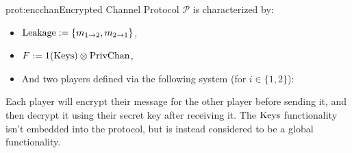 \begin{protocol}{prot:encchan}{Encrypted Channel Protocol}
    $\mathcal{P}$ is characterized by:
    \begin{itemize}
        \item $\text{Leakage} := \{m_{1\to 2}, m_{2\to1}\}$,
        \item $F := 1(\text{Keys}) \otimes \text{PrivChan}$,
        \item And two players defined via the following system (for $i \in \{1, 2\}$):
    \end{itemize}

\end{protocol}

Each player will encrypt their message for the other player before sending it,
and then decrypt it using their secret key after receiving it.
The $\text{Keys}$ functionality isn't embedded into the protocol,
but is instead considered to be a global functionality.